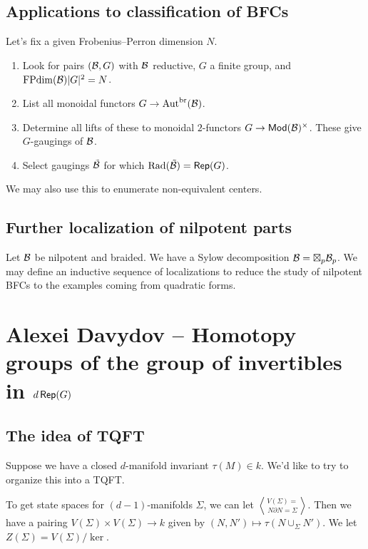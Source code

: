 \documentclass{amsart}
\begin{document}
\subsection{Applications to classification of BFCs}

Let's fix a given Frobenius--Perron dimension $N$.

\begin{enumerate}
  \item Look for pairs $(\mathcal{B}, G)$ with $\mathcal{B}$ reductive, $G$ a finite group, and $\operatorname{FPdim}(\mathcal{B})|G|^2 = N$.
  \item List all monoidal functors $G \to \operatorname{Aut}^{\mathrm{br}}(\mathcal{B})$.
  \item Determine all lifts of these to monoidal $2$-functors $G \to \mathsf{Mod}(\mathcal{B})^\times$.
    These give $G$-gaugings of $\mathcal{B}$.
  \item Select gaugings $\tilde{\mathcal{B}}$ for which $\operatorname{Rad}(\tilde{\mathcal{B}}) = \operatorname{\mathsf{Rep}}(G)$.
\end{enumerate}

We may also use this to enumerate non-equivalent centers.

\subsection{Further localization of nilpotent parts}

Let $\mathcal{B}$ be nilpotent and braided.
We have a Sylow decomposition $\mathcal{B} = \boxtimes_p \mathcal{B}_p$.
We may define an inductive sequence of localizations to reduce the study of nilpotent BFCs to the examples coming from quadratic forms.

\section{Alexei Davydov -- Homotopy groups of the group of invertibles in \texorpdfstring{$d\operatorname{\mathsf{Rep}}(G)$}{dRep(G)}}

\subsection{The idea of TQFT}

Suppose we have a closed $d$-manifold invariant $\tau(M) \in k$.
We'd like to try to organize this into a TQFT.

To get state spaces for $(d-1)$-manifolds $\Sigma$, we can let $V(\Sigma) = \bangle{N}{\partial N = \Sigma}$.
Then we have a pairing $V(\Sigma) \times V(\Sigma) \to k$ given by $(N, N') \mapsto \tau(N \cup_\Sigma N')$.
We let $Z(\Sigma) = V(\Sigma) / \ker$.
\end{document}
